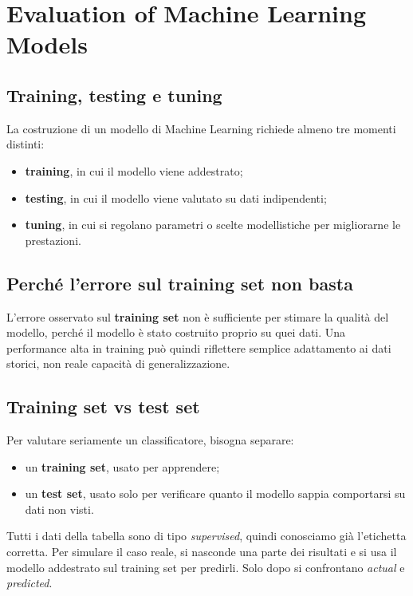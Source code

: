 \section{Evaluation of Machine Learning Models}

\subsection{Training, testing e tuning}

La costruzione di un modello di Machine Learning richiede almeno tre momenti distinti:

\begin{itemize}
    \item \textbf{training}, in cui il modello viene addestrato;
    \item \textbf{testing}, in cui il modello viene valutato su dati indipendenti;
    \item \textbf{tuning}, in cui si regolano parametri o scelte modellistiche per migliorarne le prestazioni.
\end{itemize}

\subsection{Perché l'errore sul training set non basta}

L'errore osservato sul \textbf{training set} non è sufficiente per stimare la qualità del modello, perché il modello è stato costruito proprio su quei dati. Una performance alta in training può quindi riflettere semplice adattamento ai dati storici, non reale capacità di generalizzazione.

\subsection{Training set vs test set}

Per valutare seriamente un classificatore, bisogna separare:

\begin{itemize}
    \item un \textbf{training set}, usato per apprendere;
    \item un \textbf{test set}, usato solo per verificare quanto il modello sappia comportarsi su dati non visti.
\end{itemize}

\begin{notaprof}
Tutti i dati della tabella sono di tipo \emph{supervised}, quindi conosciamo già l'etichetta corretta. Per simulare il caso reale, si nasconde una parte dei risultati e si usa il modello addestrato sul training set per predirli. Solo dopo si confrontano \emph{actual} e \emph{predicted}.
\end{notaprof}

